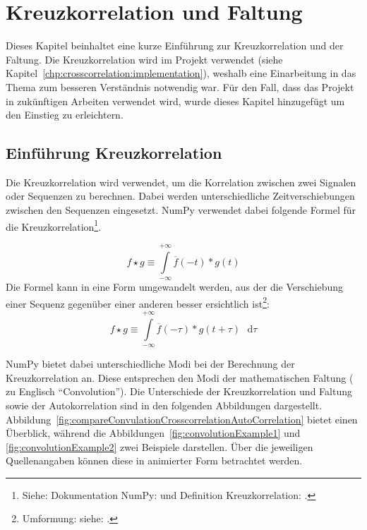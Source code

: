 \chapter{Kreuzkorrelation und Faltung}
Dieses Kapitel beinhaltet eine kurze Einführung zur Kreuzkorrelation und der Faltung.
Die Kreuzkorrelation wird im Projekt verwendet (siehe Kapitel~\ref{chp:crosscorrelation:implementation}), weshalb eine Einarbeitung in das Thema zum besseren Verständnis notwendig war.
Für den Fall, dass das Projekt in zukünftigen Arbeiten verwendet wird, wurde dieses Kapitel hinzugefügt um den Einstieg zu erleichtern.


\section{Einführung Kreuzkorrelation}
Die Kreuzkorrelation wird verwendet, um die Korrelation zwischen zwei Signalen oder Sequenzen zu berechnen. Dabei werden unterschiedliche Zeitverschiebungen zwischen
den Sequenzen eingesetzt. NumPy verwendet dabei folgende Formel für die 
Kreuzkorrelation\footnote{ Siehe: Dokumentation NumPy:\cite{DocumentationNumpyCorrelate} und Definition Kreuzkorrelation: \cite{DefinitionCrossCorrelation}.}.

\[
  f \star g \equiv \int\limits_{-\infty}^{+\infty} \overline{f}(-t)*g(t)
\]
Die Formel kann in eine Form umgewandelt werden, aus der die Verschiebung einer Sequenz gegenüber einer anderen besser ersichtlich 
ist\footnote{ Umformung: siehe: \cite{DefinitionCrossCorrelation}.}:
\[
  f \star g \equiv \int\limits_{-\infty}^{+\infty} \overline{f}(-\tau)*g(t + \tau) \text{ } \mathrm{d}\tau
\]

NumPy bietet dabei unterschiedliche Modi bei der Berechnung der Kreuzkorrelation an. Diese entsprechen den Modi der mathematischen Faltung ( zu Englisch \enquote{Convolution}).
Die Unterschiede der Kreuzkorrelation und Faltung sowie der Autokorrelation sind in den folgenden Abbildungen dargestellt.
Abbildung~\ref{fig:compareConvulationCrosscorrelationAutoCorrelation} bietet einen Überblick, während die Abbildungen~\ref{fig:convolutionExample1} und \ref{fig:convolutionExample2} zwei Beispiele darstellen.
Über die jeweiligen Quellenangaben können diese in animierter Form betrachtet werden.


